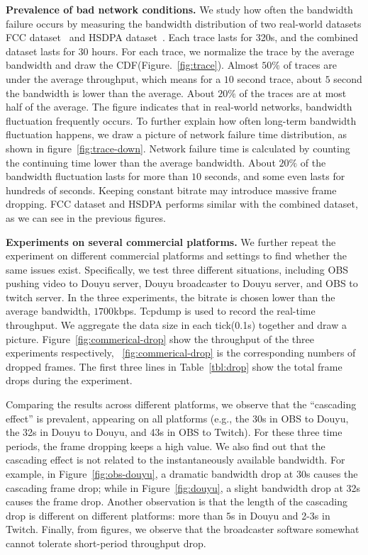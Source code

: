 
\textbf{Prevalence of bad network conditions.} We study how often the bandwidth failure occurs by measuring the bandwidth distribution of two real-world datasets \textemdash\xspace FCC dataset~\cite{FCC_dataset} and HSDPA dataset~\cite{HSDPA_dataset}. Each trace lasts for 320s, and the combined dataset lasts for $30$ hours. For each trace, we normalize the trace by the average bandwidth and draw the CDF(Figure.~\ref{fig:trace}). Almost $50\%$ of traces are under the average throughput, which means for a $10$ second trace, about $5$ second the bandwidth is lower than the average. About $20\%$ of the traces are at most half of the average. The figure indicates that in real-world networks, bandwidth fluctuation frequently occurs. To further explain how often long-term bandwidth fluctuation happens, we draw a picture of network failure time distribution, as shown in figure~\ref{fig:trace-down}. Network failure time is calculated by counting the continuing time lower than the average bandwidth. About $20\%$ of the bandwidth fluctuation lasts for more than $10$ seconds, and some even lasts for hundreds of seconds. Keeping constant bitrate may introduce massive frame dropping. FCC dataset and HSDPA performs similar with the combined dataset, as we can see in the previous figures.


\textbf{Experiments on several commercial platforms.} We further repeat the experiment on different commercial platforms and settings to find whether the same issues exist.  Specifically, we test three different situations, including OBS pushing video to Douyu server, Douyu broadcaster to Douyu server, and OBS to twitch server. In the three experiments, the bitrate is chosen lower than the average bandwidth, $1700$kbps. Tcpdump is used to record the real-time throughput. We aggregate the data size in each tick(0.1s) together and draw a picture.
Figure~\ref{fig:commerical-drop} show the throughput of the three experiments respectively, ~\ref{fig:commerical-drop} is the corresponding numbers of dropped frames. The first three lines in Table~\ref{tbl:drop} show the total frame drops during the experiment.

Comparing the results across different platforms, we observe that the ``cascading effect'' is prevalent, appearing on all platforms (e.g., the 30s in OBS to Douyu, the 32s in Douyu to Douyu, and 43s in OBS to Twitch). For these three time periods, the frame dropping keeps a high value. We also find out that the cascading effect is not related to the instantaneously available bandwidth. For example, in Figure~\ref{fig:obs-douyu}, a dramatic bandwidth drop at 30s causes the cascading frame drop; while in Figure~\ref{fig:douyu}, a slight bandwidth drop at 32s causes the frame drop. Another observation is that the length of the cascading drop is different on different platforms: more than $5$s in Douyu and 2-3s in Twitch. Finally, from figures, we observe that the broadcaster software somewhat cannot tolerate short-period throughput drop.

